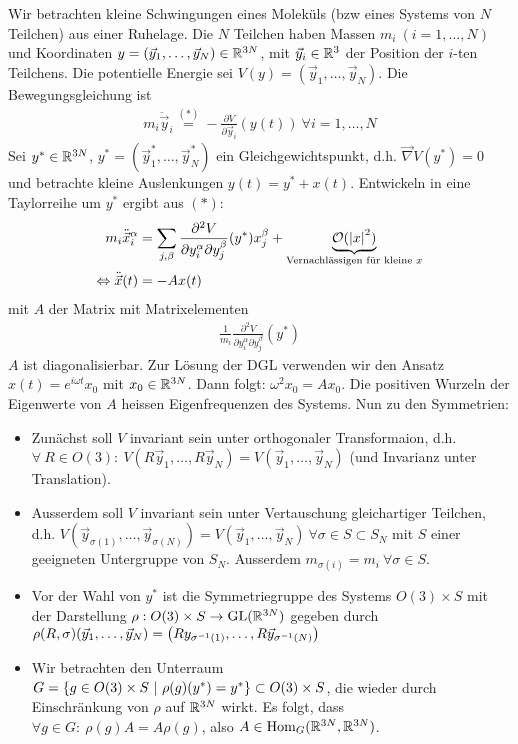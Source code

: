 Wir betrachten kleine Schwingungen eines Moleküls (bzw eines Systems
von $N$ Teilchen) aus einer Ruhelage. Die $N$ Teilchen haben Massen
$m_i \ (i=1,\dots,N)$ und Koordinaten $y = (\vec{y}_1,\dots,\vec{y}_N) \in
\mathbb{R}^{3 N}$, mit $\vec{y}_i \in \mathbb{R}^3$ der Position der $i$-ten Teilchens.
Die potentielle Energie sei $V(y) = (\vec{y}_1,\dots,\vec{y}_N)$. Die
Bewegungsgleichung ist
\begin{align*}
    m_i \ddot{\vec{y}}_i \stackrel{(\ast)}{=} - \frac{\partial V}{\partial \vec{y}_i} (y(t))
     \ \forall i = 1,\dots,N
\end{align*}
Sei $y^\ast \in \mathbb{R}^{3 N}$, $y^\ast = (\vec{y}_1^\ast,\dots,\vec{y}_N^\ast)$
ein Gleichgewichtspunkt, d.h. $\vec{\nabla} V(y^\ast) = 0$ und betrachte
kleine Auslenkungen $y(t) = y^\ast + x(t)$. Entwickeln in eine Taylorreihe
um $y^\ast$ ergibt aus $(\ast)$:
\begin{align*}
    m_i \ddot{\vec{x}}_i^\alpha &=
    \sum_{j,\beta} \frac{\partial^2 V}{\partial y_i^\alpha \partial y_j^\beta} (y^\ast) x_j^\beta
    + \underbrace{\mathcal{O}(\left\vert x \right\vert^2)}_{\text{Vernachlässigen für kleine $x$}}
    \\
    \Leftrightarrow \ddot{\vec{x}}(t) &= - A x(t)
\end{align*}
mit $A$ der Matrix mit Matrixelementen
\begin{align*}
    \frac{1}{m_i} \frac{\partial^2 V}{\partial y_i^\alpha \partial y_j^\beta} (y^\ast)
\end{align*}
$A$ ist diagonalisierbar. Zur Lösung der DGL verwenden wir den Ansatz
$x(t) = e^{i \omega t} x_0$ mit $x_0 \in \mathbb{R}^{3 N}$. Dann folgt:
$\omega^2 x_0 = A x_0$. Die positiven Wurzeln der Eigenwerte von $A$
heissen Eigenfrequenzen des Systems. Nun zu den Symmetrien:

\begin{itemize}
    \item Zunächst soll $V$ invariant sein unter orthogonaler Transformaion,
        d.h. $\forall \ R \in O(3): \ V(R \vec{y}_1 , \dots , R \vec{y}_N)
        = V(\vec{y}_1 ,\dots,\vec{y}_N)$ (und Invarianz unter Translation).
    \item Ausserdem soll $V$ invariant sein unter Vertauschung gleichartiger
        Teilchen, d.h. $V(\vec{y}_{\sigma(1)},\dots,\vec{y}_{\sigma(N)}) =
        V(\vec{y}_1,\dots,\vec{y}_N) \ \forall \sigma \in S \subset S_N$ mit
        $S$ einer geeigneten Untergruppe von $S_N$. Ausserdem $m_{\sigma(i)}
        = m_i \ \forall \sigma \in S$.
    \item Vor der Wahl von $y^\ast$ ist die Symmetriegruppe des Systems
        $O(3) \times S$ mit der Darstellung $\rho: O(3) \times S \rightarrow
        \text{GL}(\mathbb{R}^{3N})$ gegeben durch $\rho(R,\sigma)(\vec{y}_1,\dots,\vec{y}_N)
        = \left( R y_{\sigma^{-1}(1)},\dots,R \vec{y}_{\sigma^{-1}(N)} \right)$
    \item Wir betrachten den Unterraum $G = \left\{ g \in 
        O(3) \times S \ | \ \rho(g)(y^\ast) = y^\ast \right\} \subset O(3) \times S$,
        die wieder durch Einschränkung von $\rho$ auf $\mathbb{R}^{3 N}$ wirkt. Es
        folgt, dass $\forall g \in G: \ \rho(g) A = A \rho(g)$, also
        $A \in \text{Hom}_{G} (\mathbb{R}^{3 N},\mathbb{R}^{3 N})$.
\end{itemize}

